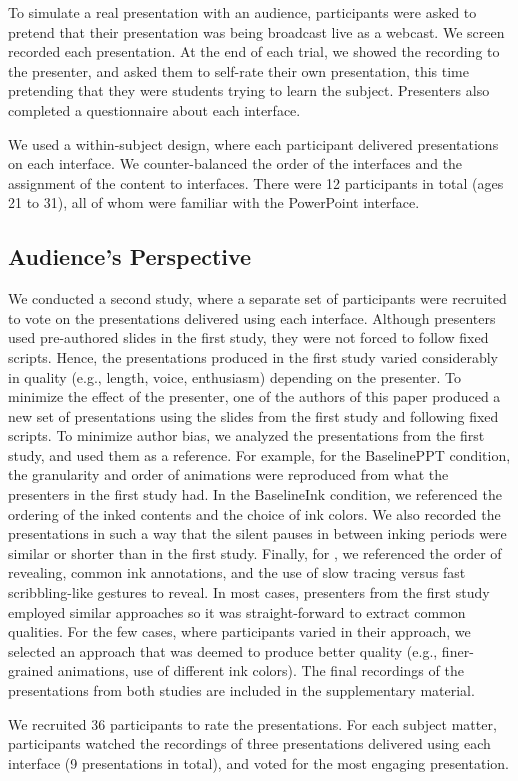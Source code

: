 To simulate a real presentation with an audience, participants were asked to pretend that their presentation was being broadcast live as a webcast. We screen recorded each presentation. At the end of each trial, we showed the recording to the presenter, and asked them to self-rate their own presentation, this time pretending that they were students trying to learn the subject. Presenters also completed a questionnaire about each interface.

We used a within-subject design, where each participant delivered presentations on each interface. We counter-balanced the order of the interfaces and the assignment of the content to interfaces. There were 12 participants in total (ages 21 to 31), all of whom were familiar with the PowerPoint interface. 

\subsection{Audience's Perspective}
We conducted a second study, where a separate set of participants were recruited to vote on the presentations delivered using each interface. Although presenters used pre-authored slides in the first study, they were not forced to follow fixed scripts. Hence, the presentations produced in the first study varied considerably in quality (e.g., length, voice, enthusiasm) depending on the presenter. To minimize the effect of the presenter, one of the authors of this paper produced a new set of presentations using the slides from the first study and following fixed scripts. To minimize author bias, we analyzed the presentations from the first study, and used them as a reference. For example, for the BaselinePPT condition, the granularity and order of animations were reproduced from what the presenters in the first study had. In the BaselineInk condition, we referenced the ordering of the inked contents and the choice of ink colors. We also recorded the presentations in such a way that the silent pauses in between inking periods were similar or shorter than in the first study. Finally, for \interface, we referenced the order of revealing, common ink annotations, and the use of slow tracing versus fast scribbling-like gestures to reveal. In most cases, presenters from the first study employed similar approaches so it was straight-forward to extract common qualities. For the few cases, where participants varied in their approach, we selected an approach that was deemed to produce better quality (e.g., finer-grained animations, use of different ink colors). The final recordings of the presentations from both studies are included in the supplementary material. 

We recruited 36 participants to rate the presentations. For each subject matter, participants watched the recordings of three presentations delivered using each interface (9 presentations in total), and voted for the most engaging presentation. 















